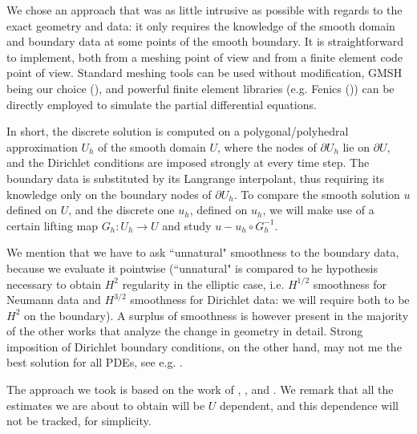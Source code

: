 \documentclass[english,a4paper,9pt,oneside]{scrbook}	%
\theoremstyle{break}
\theoremstyle{remark}
\begin{document}
\begin{appendices}
We chose an approach that was as little intrusive as possible with regards to the exact geometry and data: it only requires the knowledge of the smooth domain and boundary data at some points of the smooth boundary. It is straightforward to implement, both from a meshing point of view and from a finite element code point of view. Standard meshing tools can be used without modification, GMSH being our choice (\cite{gmsh}), and powerful finite element libraries (e.g. Fenics (\cite{fenics})) can be directly employed to simulate the partial differential equations.

In short, the discrete solution is computed on a polygonal/polyhedral approximation $U_h$ of the smooth domain $U$, where the nodes of $\partial U_h$ lie on $\partial U$, and the Dirichlet conditions are imposed strongly at every time step. The boundary data is substituted by its Langrange interpolant, thus requiring its knowledge only on the boundary nodes of $\partial U_h$. To compare the smooth solution $u$ defined on $U$, and the discrete one $u_h$, defined on $u_h$, we will make use of a certain lifting map $G_h : U_h\rightarrow U$ and study $u-u_h\circ G_h^{-1}$.

We mention that we have to ask ``unnatural" smoothness to the boundary data, because we evaluate it pointwise (``unnatural" is compared to he hypothesis necessary to obtain $H^2$ regularity in the elliptic case, i.e. $H^{1/2}$ smoothness for Neumann data and $H^{3/2}$ smoothness for Dirichlet data: we will require both to be $H^2$ on the boundary). A surplus of smoothness is however present in the majority of the other works that analyze the change in geometry in detail. Strong imposition of Dirichlet boundary conditions, on the other hand, may not me the best solution for all PDEs, see e.g. \cite{hughes}.

The approach we took is based on the work of \cite{elliott}, \cite{ranner}, \cite{bernardi} and \cite{edelmann}. We remark that all the estimates we are about to obtain will be $U$ dependent, and this dependence will not be tracked, for simplicity.




\end{appendices}
\end{document}
